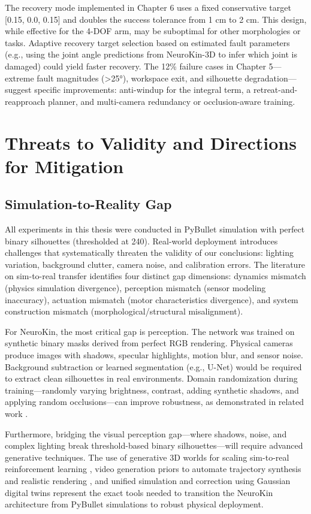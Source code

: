 \documentclass[12pt,a4paper,oneside]{report}
\begin{document}
The recovery mode implemented in Chapter 6 uses a fixed conservative target [0.15, 0.0, 0.15] and doubles the success tolerance from 1 cm to 2 cm. This design, while effective for the 4-DOF arm, may be suboptimal for other morphologies or tasks. Adaptive recovery target selection based on estimated fault parameters (e.g., using the joint angle predictions from NeuroKin-3D to infer which joint is damaged) could yield faster recovery. The 12\% failure cases in Chapter 5—extreme fault magnitudes (>25°), workspace exit, and silhouette degradation—suggest specific improvements: anti-windup for the integral term, a retreat-and-reapproach planner, and multi-camera redundancy or occlusion-aware training.

\section{Threats to Validity and Directions for Mitigation}

\subsection{Simulation-to-Reality Gap}

All experiments in this thesis were conducted in PyBullet simulation with perfect binary silhouettes (thresholded at 240). Real-world deployment introduces challenges that systematically threaten the validity of our conclusions: lighting variation, background clutter, camera noise, and calibration errors. The literature on sim-to-real transfer \cite{tan2018simtoreal, aljalbout2026realitygap} identifies four distinct gap dimensions: dynamics mismatch (physics simulation divergence), perception mismatch (sensor modeling inaccuracy), actuation mismatch (motor characteristics divergence), and system construction mismatch (morphological/structural misalignment).

For NeuroKin, the most critical gap is perception. The network was trained on synthetic binary masks derived from perfect RGB rendering. Physical cameras produce images with shadows, specular highlights, motion blur, and sensor noise. Background subtraction or learned segmentation (e.g., U-Net) would be required to extract clean silhouettes in real environments. Domain randomization during training—randomly varying brightness, contrast, adding synthetic shadows, and applying random occlusions—can improve robustness, as demonstrated in related work \cite{rezvani2024robust, qiu2024swim2real}.

Furthermore, bridging the visual perception gap—where shadows, noise, and complex lighting break threshold-based binary silhouettes—will require advanced generative techniques. The use of generative 3D worlds for scaling sim-to-real reinforcement learning \cite{choi2025scalingsim}, video generation priors to automate trajectory synthesis and realistic rendering \cite{he2025vdreamer}, and unified simulation and correction using Gaussian digital twins \cite{cai2025gausstwin} represent the exact tools needed to transition the NeuroKin architecture from PyBullet simulations to robust physical deployment.
\end{document}
